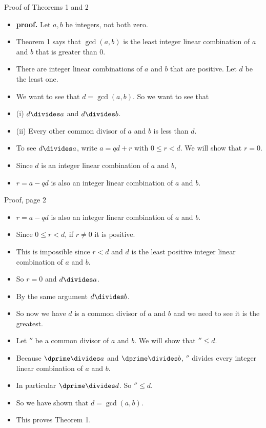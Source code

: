 \documentclass[handout]{beamer}
\begin{document}
\begin{frame}{Proof of Theorems 1 and 2}

\begin{itemize}
  \item \textbf{proof.} Let $a,b$ be integers, not both zero.
  \item Theorem 1 says that $\gcd(a,b)$ is the least integer linear combination of $a$ and $b$ that is greater than 0.
  \item There are integer linear combinations of $a$ and $b$ that are positive. Let $d$ be the least one.
  \item We want to see that $d=\gcd(a,b)$. So we want to see that
  \item (i) $d\divides a$ and $d\divides b$.
  \item (ii) Every other common divisor of $a$ and $b$ is less than $d$.
  \item To see $d\divides a$, write $a = qd + r$ with $0\leq r < d$.  We will show that $r=0$.
  \item Since $d$ is an integer linear combination of $a$ and $b$,
  \item $r=a-qd$ is also an integer linear combination of $a$ and $b$.
\end{itemize}

\end{frame}

\begin{frame}{Proof, page 2}

\begin{itemize}
  \item $r=a-qd$ is also an integer linear combination of $a$ and $b$.
  \item Since $0\leq r < d$, if $r\not=0$ it is positive.
  \item This is impossible since $r<d$ and $d$ is the least positive integer linear combination of $a$ and $b$.
  \item So $r=0$ and $d\divides a$.
  \item By the same argument $d\divides b$.
  \item So now we have $d$ is a common divisor of $a$ and $b$ and we need to see it is the greatest.
  \item Let $\dprime$ be a common divisor of $a$ and $b$. We will show that $\dprime \leq d$.
  \item Because $\dprime \divides a$ and $\dprime \divides b$, $\dprime$ divides every integer
  linear combination of $a$ and $b$.
  \item In particular $\dprime \divides d$. So $\dprime \leq d$.
  \item So we have shown that $d=\gcd(a,b)$.
  \item This proves Theorem 1.
\end{itemize}

\end{frame}
\end{document}

